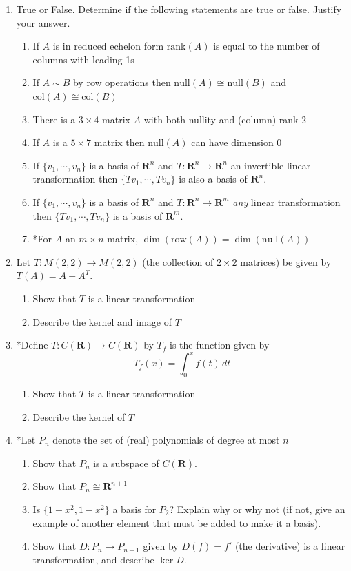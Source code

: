 \documentclass[12pt]{article}
\numberwithin{equation}{subsection}
\numberwithin{figure}{subsection}
\theoremstyle{note}
\newcommand\nul[1]{\mathrm{null}(#1)}
\newcommand\col[1]{\mathrm{col}(#1)}
\newcommand\row[1]{\mathrm{row}(#1)}
\newcommand\rank[1]{\mathrm{rank}(#1)}
\begin{document}
\begin{enumerate}[label=\arabic*.]
	

	
	\item True or False. Determine if the following statements are true or false. Justify your answer.
	\begin{enumerate}
		\item If $A$ is in reduced echelon form $\rank{A}$ is equal to the number of columns with leading 1s
		\item If $A\sim B$ by row operations then $\nul{A}\cong \nul{B}$ and $\col{A}\cong \col{B}$
		\item There is a $3\times 4$ matrix $A$ with both nullity and (column) rank 2
		\item If $A$ is a $5\times 7$ matrix then $\nul{A}$ can have dimension $0$	
		\item If $\{v_1,\cdots,v_n\}$ is a basis of $\mathbf{R}^n$ and $T\colon \mathbf{R}^n\to\mathbf{R}^n$ an invertible linear transformation then $\{Tv_1,\cdots,Tv_n\}$ is also a basis of $\mathbf{R}^n$. 
		\item If $\{v_1,\cdots,v_n\}$ is a basis of $\mathbf{R}^n$ and $T\colon \mathbf{R}^n\to\mathbf{R}^m$ \textit{any} linear transformation then $\{Tv_1,\cdots,Tv_n\}$ is a basis of $\mathbf{R}^m$. 
		\item *For $A$ an $m\times n$ matrix, $\dim(\row{A})=\dim(\nul{A})$
	\end{enumerate}
	
	
	\item Let $T\colon M(2,2)\to M(2,2)$ (the collection of $2\times 2$ matrices) be given by $T(A)=A+A^T$. 
	\begin{enumerate}
		\item Show that $T$ is a linear transformation
		\item Describe the kernel and image of $T$
	\end{enumerate}
	
		\item *Define $T\colon C(\mathbf{R})\to C(\mathbf{R})$ by $T_f$ is the function given by \[ T_f(x)=\int_0^x f(t)\,dt\]
	\begin{enumerate}
		\item Show that $T$ is a linear transformation
		\item Describe the kernel of $T$
	\end{enumerate}
	

	\item *Let $P_n$ denote the set of (real) polynomials of degree at most $n$
	\begin{enumerate}
		\item Show that $P_n$ is a subspace of $C(\mathbf{R})$. 
		\item Show that $P_n\cong \mathbf{R}^{n+1}$
		\item Is $\{1+x^2, 1-x^2\}$ a basis for $P_2$? Explain why or why not (if not, give an example of another element that must be added to make it a basis).  
		\item Show that $D\colon P_n\to P_{n-1}$ given by $D(f)=f'$ (the derivative) is a linear transformation, and describe $\ker D$.
	\end{enumerate} 
	
\end{enumerate}
\end{document}
